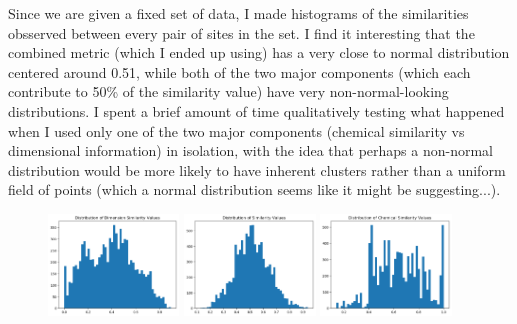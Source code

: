 \documentclass{article}
\begin{document}
Since we are given a fixed set of data, I made histograms of the similarities obsserved between every pair of sites in the set. I find it interesting that the combined metric (which I ended up using) has a very close to normal distribution centered around 0.51, while both of the two major components (which each contribute to 50\% of the similarity value) have very non-normal-looking distributions. I spent a brief amount of time qualitatively testing what happened when I used only one of the two major components (chemical similarity vs dimensional information) in isolation, with the idea that perhaps a non-normal distribution would be more likely to have inherent clusters rather than a uniform field of points (which a normal distribution seems like it might be suggesting...).
\begin{figure}[h]
\centering
\includegraphics[width=0.31\textwidth]{./similarity_histogram_dim.png}
\includegraphics[width=0.31\textwidth]{./similarity_histogram.png}
\includegraphics[width=0.31\textwidth]{./similarity_histogram_chem.png}
\end{figure}
\end{document}
